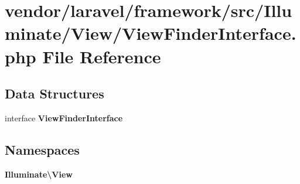 \section{vendor/laravel/framework/src/\+Illuminate/\+View/\+View\+Finder\+Interface.php File Reference}
\label{_view_finder_interface_8php}
\subsection*{Data Structures}
\begin{DoxyCompactItemize}
\item 
interface {\bf View\+Finder\+Interface}
\end{DoxyCompactItemize}
\subsection*{Namespaces}
\begin{DoxyCompactItemize}
\item 
 {\bf Illuminate\textbackslash{}\+View}
\end{DoxyCompactItemize}
